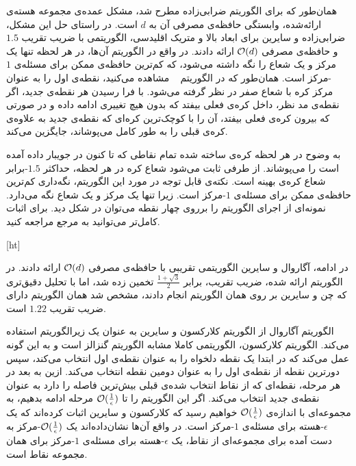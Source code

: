 همان‌طور که برای الگوریتم ضرابی‌زاده مطرح شد، مشکل عمده‌ی مجموعه هسته‌ی ارائه‌شده، وابستگی حافظه‌ی مصرفی آن به $d$ است. در راستای حل این مشکل، ضرابی‌زاده و سایرین  برای ابعاد بالا و متریک اقلیدسی، الگوریتمی با ضریب تقریب $1.5$ و حافظه‌ی مصرفی $\mathcal{O}(d)$ ارائه دادند. در واقع در الگوریتم آن‌ها، در هر لحظه تنها یک مرکز و یک شعاع را نگه داشته می‌شود، که کم‌ترین حافظه‌ی ممکن برای مسئله‌ی $1$-مرکز است. همان‌طور که در الگوریتم ~ مشاهده می‌کنید، نقطه‌ی اول را به عنوان مرکز کره با شعاع صفر در نظر گرفته می‌شود. با فرا رسیدن هر نقطه‌ی جدید، اگر نقطه‌ی مد نظر، داخل کره‌ی فعلی بیفتد که بدون هیچ‌ تغییری ادامه داده و در صورتی که بیرون کره‌ی فعلی بیفتد، آن را با کوچک‌ترین کره‌ای که نقطه‌ی جدید به علاوه‌ی کره‌ی قبلی را به طور کامل می‌پوشاند، جایگزین می‌کند. 

به وضوح در هر لحظه کره‌ی ساخته شده تمام نقاطی که تا کنون در جویبار داده آمده‌ است را می‌پوشاند. از طرفی ثابت می‌شود شعاع کره در هر لحظه، حداکثر $1.5$-برابر شعاع کره‌ی بهینه است. نکته‌ی قابل توجه در مورد این الگوریتم، نگه‌داری کم‌ترین حافظه‌ی ممکن برای مسئله‌ی $1$-مرکز است. زیرا تنها یک مرکز و یک شعاع نگه می‌دارد. نمونه‌ای از‌ اجرای الگوریتم را برروی چهار نقطه می‌توان در شکل  دید. برای اثبات کامل‌تر می‌توانید به مرجع  مراجعه کنید. 

[ht]


در ادامه، آگاروال و سایرین  الگوریتمی تقریبی با حافظه‌ی مصرفی $\mathcal{O}(d)$ ارائه دادند. در الگوریتم ارائه شده، ضریب تقریب، برابر $\frac{1 + \sqrt{3}}{2}$  تخمین زده شد، اما با تحلیل دقیق‌تری که چن و سایرین  بر روی همان الگوریتم انجام دادند، مشخص شد همان الگوریتم دارای ضریب تقریب $1.22$ است.

الگوریتم آگاروال از الگوریتم کلارکسون و سایرین  به عنوان یک زیرالگوریتم استفاده می‌کند. الگوریتم کلارکسون، الگوریتمی کاملا مشابه الگوریتم گنزالز است و به این گونه عمل می‌کند که در ابتدا یک نقطه دلخواه را به عنوان نقطه‌ی اول انتخاب می‌کند، سپس دورترین نقطه از‌ نقطه‌ی اول را به عنوان دومین نقطه انتخاب می‌کند. ازین به بعد در هر مرحله، نقطه‌ای که از نقاط انتخاب شده‌ی قبلی بیش‌ترین فاصله را دارد به عنوان نقطه‌ی جدید انتخاب می‌کند. اگر این الگوریتم را تا $\mathcal{O}(\frac{1}{\epsilon})$ مرحله ادامه بدهیم، به مجموعه‌ای با اندازه‌ی $\mathcal{O}(\frac{1}{\epsilon})$ خواهیم رسید که  کلارکسون و سایرین اثبات کرده‌اند که یک $\epsilon$-هسته برای مسئله‌ی $1$-مرکز‌ است. در واقع آن‌ها نشان‌داده‌اند یک $\mathcal{O}(\frac{1}{\epsilon})$-مرکز به دست آمده برای مجموعه‌ای از نقاط، یک $\epsilon$-هسته برای مسئله‌ی $1$-مرکز برای همان مجموعه نقاط است.

